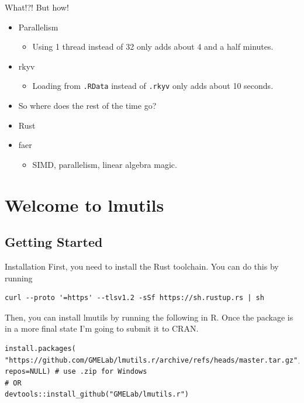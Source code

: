 \documentclass[10pt,handout]{beamer}
\begin{document}
\begin{frame}[fragile]{What!?! But how!}
  \begin{itemize}[<+->]
    \item Parallelism
      \begin{itemize}
        \item Using 1 thread instead of 32 only adds about 4 and a half minutes.
      \end{itemize}
    \item rkyv
      \begin{itemize}
        \item Loading from \texttt{.RData} instead of \texttt{.rkyv} only adds about 10 seconds.
      \end{itemize}
    \item So where does the rest of the time go?
    \item Rust
    \item faer
      \begin{itemize}
        \item SIMD, parallelism, linear algebra magic.
      \end{itemize}
  \end{itemize}
\end{frame}

\section[Welcome to lmutils]{Welcome to lmutils}

\subsection{Getting Started}

\begin{frame}[fragile]{Installation}
  First, you need to install the Rust toolchain. You can do this by running
\begin{verbatim}
curl --proto '=https' --tlsv1.2 -sSf https://sh.rustup.rs | sh
\end{verbatim}
  Then, you can install lmutils by running the following in R. Once the package is in a more final state I'm going to submit it to CRAN.
\begin{small}
\begin{verbatim}
install.packages(
"https://github.com/GMELab/lmutils.r/archive/refs/heads/master.tar.gz",
repos=NULL) # use .zip for Windows
# OR
devtools::install_github("GMELab/lmutils.r")
\end{verbatim}
\end{small}
\end{frame}
\end{document}
